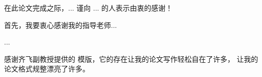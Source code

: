 
\begin{acknowledgments}

  在此论文完成之际，... 谨向 ... 的人表示由衷的感谢！

  首先，我要衷心感谢我的指导老师...

  ...
  
  感谢齐飞副教授提供的 \xduthesis{} 模版，它的存在让我的论文写作轻松自在了许多，
  让我的论文格式规整漂亮了许多。

\end{acknowledgments}

